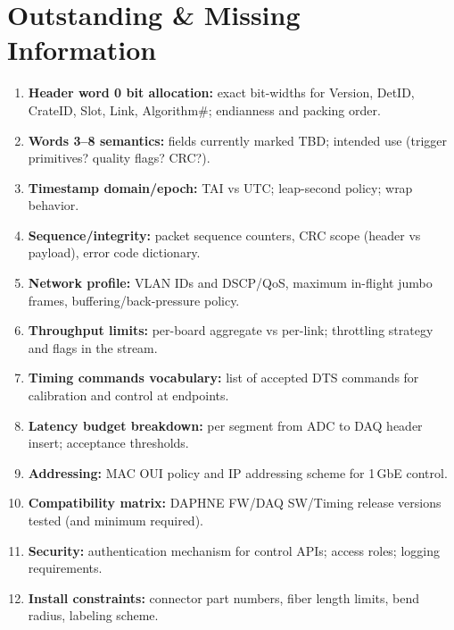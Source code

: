 
\section{Outstanding \& Missing Information}
\begin{enumerate}
  \item \textbf{Header word 0 bit allocation:} exact bit-widths for Version, DetID, CrateID, Slot, Link, Algorithm\#; endianness and packing order.
  \item \textbf{Words 3--8 semantics:} fields currently marked TBD; intended use (trigger primitives? quality flags? CRC?).
  \item \textbf{Timestamp domain/epoch:} TAI vs UTC; leap-second policy; wrap behavior.
  \item \textbf{Sequence/integrity:} packet sequence counters, CRC scope (header vs payload), error code dictionary.
  \item \textbf{Network profile:} VLAN IDs and DSCP/QoS, maximum in-flight jumbo frames, buffering/back-pressure policy.
  \item \textbf{Throughput limits:} per-board aggregate vs per-link; throttling strategy and flags in the stream.
  \item \textbf{Timing commands vocabulary:} list of accepted DTS commands for calibration and control at endpoints.
  \item \textbf{Latency budget breakdown:} per segment from ADC to DAQ header insert; acceptance thresholds.
  \item \textbf{Addressing:} MAC OUI policy and IP addressing scheme for 1\,GbE control.
  \item \textbf{Compatibility matrix:} DAPHNE FW/DAQ SW/Timing release versions tested (and minimum required).
  \item \textbf{Security:} authentication mechanism for control APIs; access roles; logging requirements.
  \item \textbf{Install constraints:} connector part numbers, fiber length limits, bend radius, labeling scheme.
\end{enumerate}
